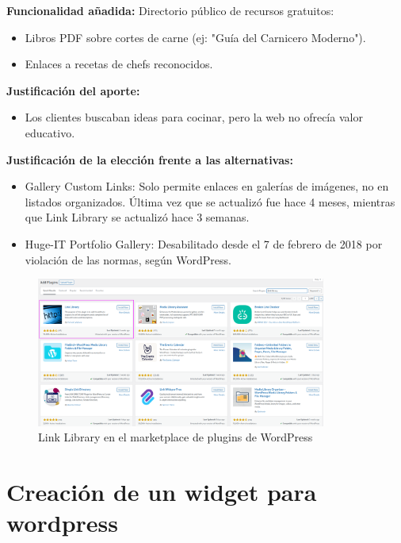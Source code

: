 \documentclass[a4paper]{article}
\begin{document}
\textbf{Funcionalidad añadida:} Directorio público de recursos gratuitos:
\begin{itemize}
    \item Libros PDF sobre cortes de carne (ej: "Guía del Carnicero Moderno").
    \item Enlaces a recetas de chefs reconocidos.
\end{itemize}


\textbf{Justificación del aporte:}
\begin{itemize}
    \item Los clientes buscaban ideas para cocinar, pero la web no ofrecía valor educativo.
\end{itemize}


\textbf{Justificación de la elección frente a las alternativas:}
\begin{itemize}
    \item Gallery Custom Links: Solo permite enlaces en galerías de imágenes, no en listados organizados. Última vez que se actualizó fue hace 4 meses, mientras que Link Library se actualizó hace 3 semanas.
    \item Huge-IT Portfolio Gallery: Desabilitado desde el 7 de febrero de 2018 por violación de las normas, según WordPress.
\end{itemize}

\begin{figure}[H]
    \centering
    \includegraphics[width=0.85\textwidth]{images/popularidad-link-library.png}
    \caption{Link Library en el marketplace de plugins de WordPress}
\end{figure}

\newpage



\section{Creación de un widget para wordpress}
\end{document}
